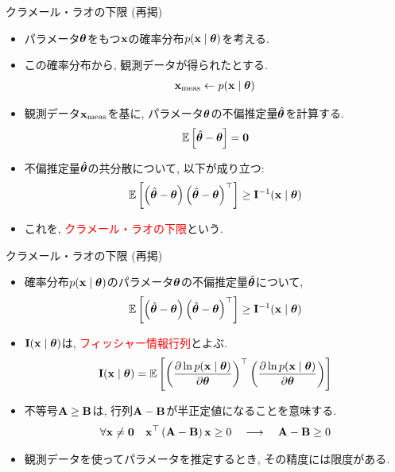 \documentclass[dvipdfmx,notheorems,t]{beamer}
\begin{document}
\begin{frame}{クラメール・ラオの下限 (再掲)}
\begin{itemize}
  \item パラメータ$\vb*{\theta}$をもつ$\vb{x}$の確率分布$p(\vb{x} \mid \vb*{\theta})$を考える.
  \item この確率分布から, 観測データが得られたとする.
  \begin{align*}
    \vb{x}_\mathrm{meas} \gets p(\vb{x} \mid \vb*{\theta})
  \end{align*}
  \item 観測データ$\vb{x}_\mathrm{meas}$を基に,
  パラメータ$\vb*{\theta}$の不偏推定量$\hat{\vb*{\theta}}$を計算する.
  \begin{align*}
    \operatorname{\mathbb{E}} \left[ \hat{\vb*{\theta}} - \vb*{\theta} \right] = \vb{0}
  \end{align*}
  \item 不偏推定量$\hat{\vb*{\theta}}$の共分散について, 以下が成り立つ:
  \begin{align*}
    \operatorname{\mathbb{E}} \left[ \left( \hat{\vb*{\theta}} - \vb*{\theta} \right)
      \left( \hat{\vb*{\theta}} - \vb*{\theta} \right)^\top \right] \ge \vb{I}^{-1}(\vb{x} \mid \vb*{\theta})
  \end{align*}
  \item これを, \textcolor{red}{クラメール・ラオの下限}という.
\end{itemize}
\end{frame}

\begin{frame}{クラメール・ラオの下限 (再掲)}
\begin{itemize}
  \item 確率分布$p(\vb{x} \mid \vb*{\theta})$のパラメータ$\vb*{\theta}$の不偏推定量$\hat{\vb*{\theta}}$について,
  \begin{align*}
    \operatorname{\mathbb{E}} \left[ \left( \hat{\vb*{\theta}} - \vb*{\theta} \right)
      \left( \hat{\vb*{\theta}} - \vb*{\theta} \right)^\top \right] \ge \vb{I}^{-1}(\vb{x} \mid \vb*{\theta})
  \end{align*}
  \item $\vb{I}(\vb{x} \mid \vb*{\theta})$は, \textcolor{red}{フィッシャー情報行列}とよぶ.
  \begin{align*}
    \vb{I}(\vb{x} \mid \vb*{\theta}) = \operatorname{\mathbb{E}} \left[ 
      \left( \pdv{\ln p(\vb{x} \mid \vb*{\theta})}{\vb*{\theta}} \right)^\top
      \left( \pdv{\ln p(\vb{x} \mid \vb*{\theta})}{\vb*{\theta}} \right) \right]
  \end{align*}
  \item 不等号$\vb{A} \ge \vb{B}$は, 行列$\vb{A} - \vb{B}$が半正定値になることを意味する.
  \begin{align*}
    \forall \vb{x} \neq \vb{0} \quad \vb{x}^\top \left( \vb{A} - \vb{B} \right) \vb{x} \ge 0
    \quad \longrightarrow \quad \vb{A} - \vb{B} \ge 0
  \end{align*}
  \item 観測データを使ってパラメータを推定するとき, その精度には限度がある.
\end{itemize}
\end{frame}
\end{document}
